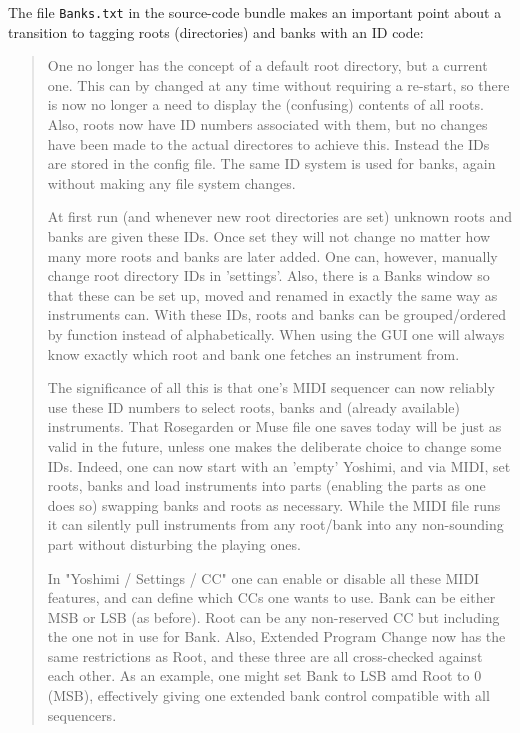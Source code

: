    The file \texttt{Banks.txt} in the source-code bundle makes an important
   point about a transition to tagging roots (directories) and banks with an
   ID code:

   \begin{quotation}
      One no longer has the concept of a default root directory, but a
      current one. This can by changed at any time without requiring a
      re-start, so there is now no longer a need to display the (confusing)
      contents of all roots.  Also, roots now have ID numbers associated
      with them, but no changes have been made to the actual directores to
      achieve this. Instead the IDs are stored in the config file. The same
      ID system is used for banks, again without making any file system
      changes.

      At first run (and whenever new root directories are set) unknown roots
      and banks are given these IDs. Once set they will not change no matter
      how many more roots and banks are later added. One can, however,
      manually change root directory IDs in 'settings'. Also, there is a
      Banks window so that these can be set up, moved and renamed in exactly
      the same way as instruments can.  With these IDs, roots and banks can
      be grouped/ordered by function instead of alphabetically. When using
      the GUI one will always know exactly which root and bank one fetches
      an instrument from.

      The significance of all this is that one's MIDI sequencer can now
      reliably use these ID numbers to select roots, banks and (already
      available) instruments. That Rosegarden or Muse file one saves
      today will be just as valid in the future, unless one makes the
      deliberate choice to change some IDs. Indeed, one can now start with
      an 'empty' Yoshimi, and via MIDI, set roots, banks and load
      instruments into parts (enabling the parts as one does so) swapping
      banks and roots as necessary. While the MIDI file runs it can silently
      pull instruments from any root/bank into any non-sounding part without
      disturbing the playing ones.

      In "Yoshimi / Settings / CC" one can enable or disable all these MIDI
      features, and can define which CCs one wants to use. Bank can be either
      MSB or LSB (as before). Root can be any non-reserved CC but including
      the one not in use for Bank. Also, Extended Program Change now has the
      same restrictions as Root, and these three are all cross-checked
      against each other. As an example, one might set Bank to LSB amd Root
      to 0 (MSB), effectively giving one extended bank control compatible
      with all sequencers.


\end{quotation}
